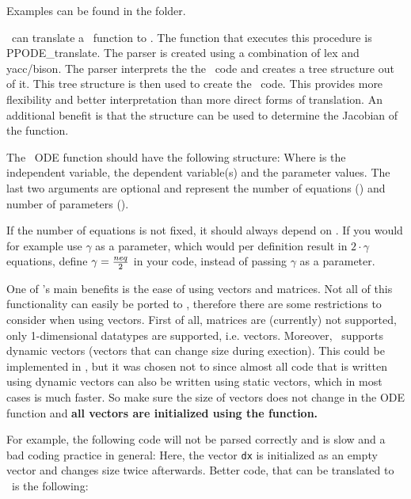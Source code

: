 

Examples can be found in the  folder.

 \label{sec:Parser}
\PPODESUITE~can translate a \MATLAB~function to \Fortran. The function that executes this procedure is PPODE\_translate. The parser is created using a combination of lex and yacc/bison. The parser interprets the the \MATLAB~code and creates a tree structure out of it. This tree structure is then used to create the \Fortran~code. This provides more flexibility and better interpretation than more direct forms of translation. An additional benefit is that the structure can be used to determine the Jacobian of the function.

The \MATLAB~ODE function should have the following structure:
Where  is the independent variable,  the dependent variable(s) and  the parameter values. The last two arguments are optional and represent the number of equations () and number of parameters ().

If the number of equations is not fixed, it should always depend on . If you would for example use $\gamma$ as a parameter, which would per definition result in $2\cdot\gamma$ equations, define $\gamma = {neq \over 2}$ in your code, instead of passing $\gamma$ as a parameter.

One of \MATLAB's main benefits is the ease of using vectors and matrices. Not all of this functionality can easily be ported to \Fortran, therefore there are some restrictions to consider when using vectors. First of all, matrices are (currently) not supported, only 1-dimensional datatypes are supported, i.e. vectors. Moreover, \MATLAB~supports dynamic vectors (vectors that can change size during exection). This could be implemented in \Fortran, but it was chosen not to since almost all code that is written using dynamic vectors can also be written using static vectors, which in most cases is much faster. So make sure the size of vectors does not change in the ODE function and \textbf{all vectors are initialized using the  function.}

For example, the following code will not be parsed correctly and is slow and a bad coding practice in general:
Here, the vector \texttt{dx} is initialized as an empty vector and changes size twice afterwards. Better code, that can be translated to \Fortran~is the following:


